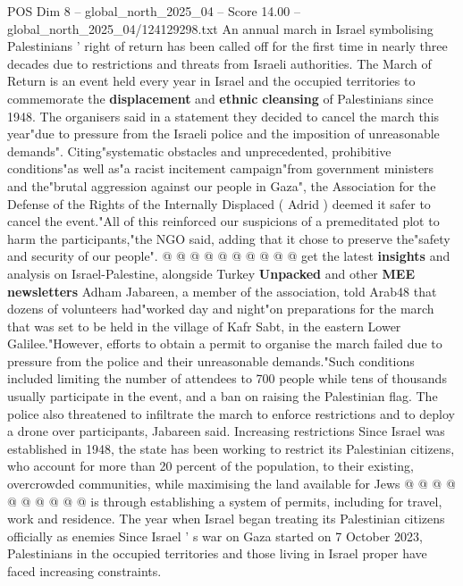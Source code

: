 \begin{textsample}{POS Dim 8 – global\_north\_2025\_04 – Score 14.00 – global\_north\_2025\_04/124129298.txt}  \label{ex:f8_pos_022}
An annual march in Israel symbolising Palestinians ' right of return has been called off for the first time in nearly three decades due to restrictions and threats from Israeli authorities.
The March of Return is an event held every year in Israel and the occupied territories to commemorate the \textbf{displacement} and \textbf{ethnic} \textbf{cleansing} of Palestinians since 1948.
The organisers said in a statement they decided to cancel the march this year"due to pressure from the Israeli police and the imposition of unreasonable demands".
Citing"systematic obstacles and unprecedented, prohibitive conditions"as well as"a racist incitement campaign"from government ministers and the"brutal aggression against our people in Gaza", the Association for the Defense of the Rights of the Internally Displaced ( Adrid ) deemed it safer to cancel the event."All of this reinforced our suspicions of a premeditated plot to harm the participants,"the NGO said, adding that it chose to preserve the"safety and security of our people". @ @ @ @ @ @ @ @ @ @ get the latest \textbf{insights} and analysis on Israel-Palestine, alongside Turkey \textbf{Unpacked} and other \textbf{MEE} \textbf{newsletters} Adham Jabareen, a member of the association, told Arab48 that dozens of volunteers had"worked day and night"on preparations for the march that was set to be held in the village of Kafr Sabt, in the eastern Lower Galilee."However, efforts to obtain a permit to organise the march failed due to pressure from the police and their unreasonable demands."Such conditions included limiting the number of attendees to 700 people while tens of thousands usually participate in the event, and a ban on raising the Palestinian flag.
The police also threatened to infiltrate the march to enforce restrictions and to deploy a drone over participants, Jabareen said.
Increasing restrictions Since Israel was established in 1948, the state has been working to restrict its Palestinian citizens, who account for more than 20 percent of the population, to their existing, overcrowded communities, while maximising the land available for Jews @ @ @ @ @ @ @ @ @ @ is through establishing a system of permits, including for travel, work and residence.
The year when Israel began treating its Palestinian citizens officially as enemies Since Israel ' s war on Gaza started on 7 October 2023, Palestinians in the occupied territories and those living in Israel proper have faced increasing constraints.

\end{textsample}
